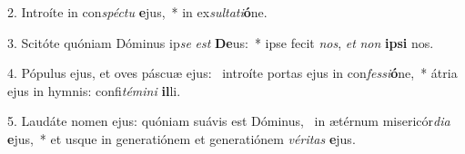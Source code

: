 2. Introíte in con\textit{spéc}\textit{tu} \textbf{e}jus,~*  in ex\textit{sul}\textit{ta}\textit{ti}\textbf{ó}ne.\

3. Scitóte quóniam Dóminus ip\textit{se} \textit{est} \textbf{De}us:~*  ipse fecit \textit{nos}, \textit{et} \textit{non} \textbf{ip}\textbf{si} nos.\

4. Pópulus ejus, et oves páscuæ ejus: \dag\  introíte portas ejus in con\textit{fes}\textit{si}\textbf{ó}ne,~*  átria ejus in hymnis: confi\textit{té}\textit{mi}\textit{ni} \textbf{il}li.\

5. Laudáte nomen ejus: quóniam suávis est Dóminus, \dag\  in ætérnum misericór\textit{di}\textit{a} \textbf{e}jus,~*  et usque in generatiónem et generatiónem \textit{vé}\textit{ri}\textit{tas} \textbf{e}jus.\


